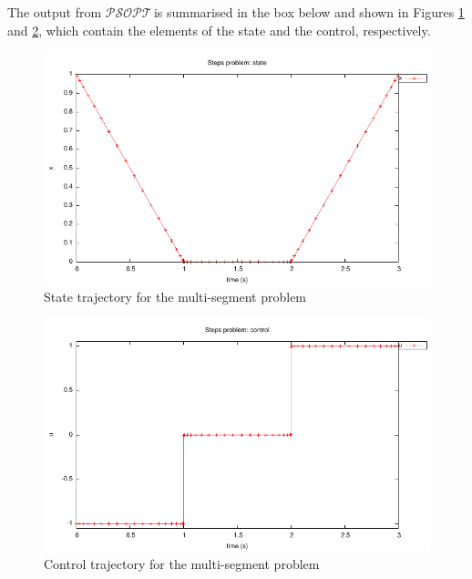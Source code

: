 \documentclass[a4paper,11pt]{report}    %
\newcommand{\psopt}{$\mathcal{PSOPT}$\,}  %
\newenvironment{shadedframe}{%
  \def\FrameCommand{\fcolorbox{black}{shadecolor}}%
  \MakeFramed {\FrameRestore}}
{\endMakeFramed}
\begin{document}
The output from \psopt is summarised in the box below and shown in Figures \ref{fig:steps_state} and \ref{fig:steps_control}, which contain the elements
of the state and the control, respectively.

\begin{shadedframe}

\end{shadedframe}

\begin{figure}
  \centering 
  \includegraphics{../examples/steps/steps_state}
  \caption{State trajectory for the multi-segment problem}
 \label{fig:steps_state}
\end{figure}


\begin{figure}
  \centering
  \includegraphics{../examples/steps/steps_control}
  \caption{Control trajectory for the multi-segment problem}
 \label{fig:steps_control}
\end{figure}
\end{document}
